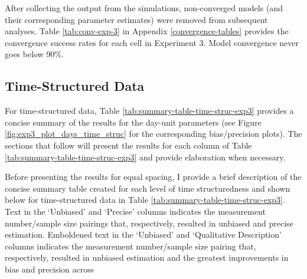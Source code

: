 \documentclass[
12pt, %
twoside,
english]{guelphthesis}
\begin{document}
After collecting the output from the simulations, non-converged models
(and their corresponding parameter estimates) were removed from
subsequent analyses. Table \ref{tab:conv-exp-3} in Appendix \ref{convergence-tables} provides the convergence
success rates for each cell in Experiment 3. Model convergence never goes below 90\%.

\hypertarget{concise-example-exp3}{%
\subsection{Time-Structured Data}\label{concise-example-exp3}}

For time-structured data, Table \ref{tab:summary-table-time-struc-exp3} provides a concise summary of the results for the day-unit parameters (see Figure \ref{fig:exp3_plot_days_time_struc} for the corresponding bias/precision plots). The sections that follow will present the results for each column of Table \ref{tab:summary-table-time-struc-exp3} and provide elaboration when necessary.

Before presenting the results for equal spacing, I provide a brief description of the concise summary table created for each level of time structuredness and shown below for time-structured data in Table \ref{tab:summary-table-time-struc-exp3}. Text in the `Unbiased' and `Precise' columns indicates the measurement number/sample size pairings that, respectively, resulted in unbiased and precise estimation. Emboldened text in the `Unbiased' and `Qualitative Description' columns indicates the measurement number/sample size pairing that, respectively, resulted in unbiased estimation and the greatest improvements in bias and precision across

\noindent
\end{document}
